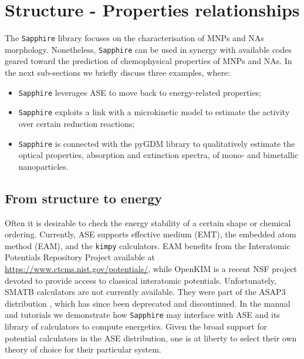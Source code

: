 \section{Structure - Properties relationships}

The \texttt{Sapphire} library focuses on the characterisation of MNPs and NAs morphology.
%
Nonetheless, \texttt{Sapphire} can be used in synergy with available codes geared toward the prediction of chemophysical properties of MNPs and NAs.
%
In the next sub-sections we briefly discuss three examples, where:
\begin{itemize}
    \item \texttt{Sapphire} leverages ASE to move back to energy-related properties; 
    \item \texttt{Sapphire} exploits a link with a microkinetic model \cite{Gazzarrini2021} to estimate the activity over certain reduction reactions; \item \texttt{Sapphire} is connected with the pyGDM \cite{GDM} library to qualitatively estimate the optical properties, absorption and extinction spectra, of mono- and bimetallic nanoparticles.
\end{itemize}

\subsection{From structure to energy} 
Often it is desirable to check the energy stability of a certain shape or chemical ordering. 
Currently, ASE supports effective medium (EMT), the embedded atom method (EAM), and the \texttt{kimpy} calculators. EAM benefits from the Interatomic Potentials Repository Project available at \url{https://www.ctcms.nist.gov/potentials/}, while OpenKIM is a recent NSF project devoted to provide access to  classical interatomic potentials. Unfortunately, SMATB calculators are not currently available. They were part of the ASAP3 distribution \cite{asap3}, which has since been deprecated and discontinued.
In the manual and tutorials we demonstrate how \texttt{Sapphire} may interface with ASE and its library of calculators to compute energetics. Given the broad support for potential calculators in the ASE distribution, one is at liberty to select their own theory of choice for their particular system.

